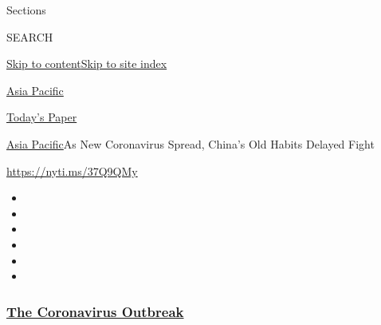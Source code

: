 Sections

SEARCH

\protect\hyperlink{site-content}{Skip to
content}\protect\hyperlink{site-index}{Skip to site index}

\href{https://www.nytimes3xbfgragh.onion/section/world/asia}{Asia
Pacific}

\href{https://myaccount.nytimes3xbfgragh.onion/auth/login?response_type=cookie\&client_id=vi}{}

\href{https://www.nytimes3xbfgragh.onion/section/todayspaper}{Today's
Paper}

\href{/section/world/asia}{Asia Pacific}\textbar{}As New Coronavirus
Spread, China's Old Habits Delayed Fight

\url{https://nyti.ms/37Q9QMy}

\begin{itemize}
\item
\item
\item
\item
\item
\item
\end{itemize}

\hypertarget{the-coronavirus-outbreak}{%
\subsubsection{\texorpdfstring{\href{https://www.nytimes3xbfgragh.onion/news-event/coronavirus?name=styln-coronavirus-national\&region=TOP_BANNER\&variant=undefined\&block=storyline_menu_recirc\&action=click\&pgtype=Article\&impression_id=690d9df0-e38f-11ea-8aa7-fb86b0867258}{The
Coronavirus
Outbreak}}{The Coronavirus Outbreak}}\label{the-coronavirus-outbreak}}

